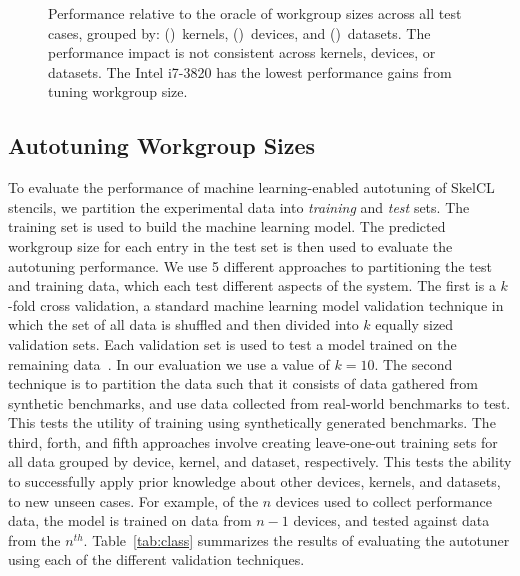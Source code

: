 \documentclass[nonatbib,preprint,nocopyrightspace,9pt]{sigplanconf}
\begin{document}
\begin{figure}
\begin{subfigure}[h]{.48\columnwidth}
    \vspace{-1.5em} %
    \caption{}
    \label{fig:performance-datasets}
  \end{subfigure}
  \caption{%
    Performance relative to the oracle of workgroup sizes across all test cases,
    grouped by: ()~kernels, ()~devices, and ()~datasets. The performance impact is not consistent across
    kernels, devices, or datasets. The Intel i7-3820 has the lowest performance
    gains from tuning workgroup size.%
    \vspace{-2em}
  }
  \label{fig:performances}
\end{figure}

\subsection{Autotuning Workgroup Sizes}

To evaluate the performance of machine learning-enabled autotuning of
SkelCL stencils, we partition the experimental data into
\emph{training} and \emph{test} sets. The training set is used to
build the machine learning model. The predicted workgroup size for each entry in
the test set is then used to evaluate the autotuning performance. We use 5
different approaches to partitioning the test and training data, which each test
different aspects of the system. The first is a $k$-fold cross validation, a
standard machine learning model validation technique in which the set of all
data is shuffled and then divided into $k$ equally sized validation sets. Each
validation set is used to test a model trained on the remaining
data~\cite{Han2011}. In our evaluation we use a value of $k=10$. The second
technique is to partition the data such that it consists of data gathered from
synthetic benchmarks, and use data collected from real-world benchmarks to test.
This tests the utility of training using synthetically generated benchmarks. The
third, forth, and fifth approaches involve creating leave-one-out training sets
for all data grouped by device, kernel, and dataset, respectively. This tests
the ability to successfully apply prior knowledge about other devices, kernels,
and datasets, to new unseen cases. For example, of the $n$ devices used to
collect performance data, the model is trained on data from $n-1$ devices, and
tested against data from the $n^{th}$. Table~\ref{tab:class} summarizes the
results of evaluating the autotuner using each of the different validation
techniques.
\end{document}
